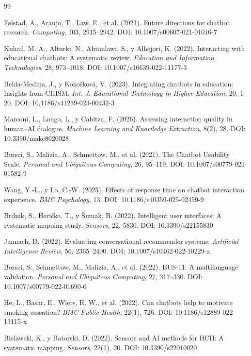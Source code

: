 \documentclass[11pt,twocolumn]{article}
\begin{document}
\begin{thebibliography}{99}
\footnotesize

Følstad, A., Araujo, T., Law, E., et al. (2021). Future directions for chatbot research. \textit{Computing}, 103, 2915--2942. DOI: 10.1007/s00607-021-01016-7

Kuhail, M. A., Alturki, N., Alramlawi, S., y Alhejori, K. (2022). Interacting with educational chatbots: A systematic review. \textit{Education and Information Technologies}, 28, 973--1018. DOI: 10.1007/s10639-022-11177-3

Belda-Medina, J., y Kokošková, V. (2023). Integrating chatbots in education: Insights from CHISM. \textit{Int. J. Educational Technology in Higher Education}, 20, 1--20. DOI: 10.1186/s41239-023-00432-3

Marconi, L., Longo, L., y Cabitza, F. (2026). Assessing interaction quality in human--AI dialogue. \textit{Machine Learning and Knowledge Extraction}, 8(2), 28. DOI: 10.3390/make8020028

Borsci, S., Malizia, A., Schmettow, M., et al. (2021). The Chatbot Usability Scale. \textit{Personal and Ubiquitous Computing}, 26, 95--119. DOI: 10.1007/s00779-021-01582-9

Wang, Y.-L., y Lo, C.-W. (2025). Effects of response time on chatbot interaction experience. \textit{BMC Psychology}, 13. DOI: 10.1186/s40359-025-02459-9

Brdnik, S., Heričko, T., y Šumak, B. (2022). Intelligent user interfaces: A systematic mapping study. \textit{Sensors}, 22, 5830. DOI: 10.3390/s22155830

Jannach, D. (2022). Evaluating conversational recommender systems. \textit{Artificial Intelligence Review}, 56, 2365--2400. DOI: 10.1007/s10462-022-10229-x

Borsci, S., Schmettow, M., Malizia, A., et al. (2022). BUS-11: A multilanguage validation. \textit{Personal and Ubiquitous Computing}, 27, 317--330. DOI: 10.1007/s00779-022-01690-0

He, L., Basar, E., Wiers, R. W., et al. (2022). Can chatbots help to motivate smoking cessation? \textit{BMC Public Health}, 22(1), 726. DOI: 10.1186/s12889-022-13115-x

Bielawski, K., y Batorski, D. (2022). Sensors and AI methods for HCII: A systematic mapping. \textit{Sensors}, 22(1), 20. DOI: 10.3390/s22010020


\end{thebibliography}
\end{document}
